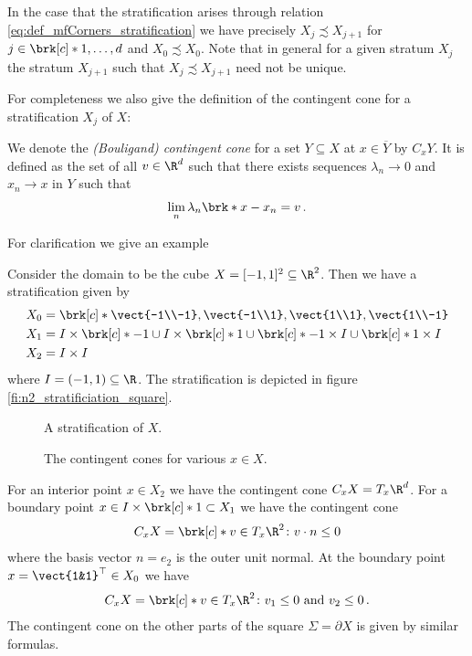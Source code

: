 In the case that the stratification arises through relation \eqref{eq:def_mfCorners_stratification}
we have precisely $X_{j}\precsim X_{j+1}$ for $j\in\brk[c]*{1,\dots,d}$ and $X_0\precsim X_0$.
Note that in general for a given stratum $X_j$ the stratum $X_{j+1}$ such that $X_j\precsim X_{j+1}$ need not be unique.

For completeness we also give the definition of the contingent cone for a 
stratification $X_j$ of $X$:
\begin{definition}
  We denote the \emph{(Bouligand) contingent cone} for a set $Y\subseteq X$ at $x\in\overline{Y}$ by $C_xY$.
  It is defined as the set of all $v\in\R^d$ such that there exists sequences $\lambda_n\to0$ and $x_n\to x$ in
  $Y$ such that
  $$\lim_n\lambda_n\brk*{x-x_n}=v\,.$$
\end{definition}

For clarification we give an example
\begin{example}
  Consider the domain to be the cube $X=[-1,1]^2\subseteq\R^2$.
  Then we have a stratification given by
  \begin{align*}
    X_0&=\brk[c]*{\vect{-1\\-1},\vect{-1\\1},\vect{1\\1},\vect{1\\-1}}\\
    X_1&=I\times\brk[c]*{-1}\cup I\times\brk[c]*{1}\cup \brk[c]*{-1}\times I\cup \brk[c]*{1}\times I\\
    X_2&=I\times I
  \end{align*}
  where $I=(-1,1)\subseteq\R$.
  The stratification is depicted in figure \ref{fi:n2_stratificiation_square}.
  \begin{figure}
    \centering
    \begin{minipage}[h]{0.4\textwidth}
      
      \caption{A stratification of $X$.}
      \label{fi:n2_stratificiation_square}
    \end{minipage}
    \hfill
    \begin{minipage}[h]{0.4\textwidth}
      
      \caption{The contingent cones for various $x\in X$.}
      \label{fi:n2_tangencyCone_square}
    \end{minipage}
  \end{figure}
  For an interior point $x\in X_2$ we have 
  the contingent cone $C_xX=T_x\R^d$.
  For a boundary point $x\in I\times \brk[c]*{1}\subset X_1$ we have the contingent cone
  \begin{align*}
    C_xX=\brk[c]*{v\in T_x\R^2\colon v\cdot n\leq 0}
  \end{align*}
  where the basis vector $n=e_2$ is the outer unit normal. At the boundary point $x=\vect{1&1}^\top\in X_0$ we have
  \begin{align*}
    C_xX=\brk[c]*{v\in T_x\R^2\colon v_1\leq0\text{ and }v_2\leq 0}\,.
  \end{align*}
  The contingent cone on the other parts of the square $\Sigma=\partial X$ is given by similar formulas.
\end{example}

